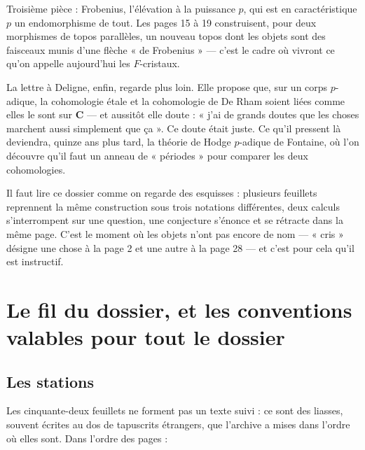 \documentclass[11pt,a4paper]{article}
\begin{document}
\begin{resume}
Troisième pièce : Frobenius, l'élévation à la puissance $p$, qui est en
caractéristique $p$ un endomorphisme de tout. Les pages 15 à 19 construisent,
pour deux morphismes de topos parallèles, un nouveau topos dont les objets
sont des faisceaux munis d'une flèche « de Frobenius » — c'est le cadre où
vivront ce qu'on appelle aujourd'hui les $F$-cristaux.

La lettre à Deligne, enfin, regarde plus loin. Elle propose que, sur un corps
$p$-adique, la cohomologie étale et la cohomologie de De Rham soient liées
comme elles le sont sur $\mathbf{C}$ — et aussitôt elle doute : « j'ai de
grands doutes que les choses marchent aussi simplement que ça ». Ce doute était
juste. Ce qu'il pressent là deviendra, quinze ans plus tard, la théorie de
Hodge $p$-adique de Fontaine, où l'on découvre qu'il faut un anneau de
« périodes » pour comparer les deux cohomologies.

Il faut lire ce dossier comme on regarde des esquisses : plusieurs feuillets
reprennent la même construction sous trois notations différentes, deux
calculs s'interrompent sur une question, une conjecture s'énonce et se
rétracte dans la même page. C'est le moment où les objets n'ont pas encore
de nom — « cris » désigne une chose à la page 2 et une autre à la page 28 —
et c'est pour cela qu'il est instructif.

\end{resume}

\section*{Le fil du dossier, et les conventions valables pour tout le dossier}

\subsection*{Les stations}

Les cinquante-deux feuillets ne forment pas un texte suivi : ce sont des
liasses, souvent écrites au dos de tapuscrits étrangers, que l'archive a
mises dans l'ordre où elles sont. Dans l'ordre des pages :
\end{document}
